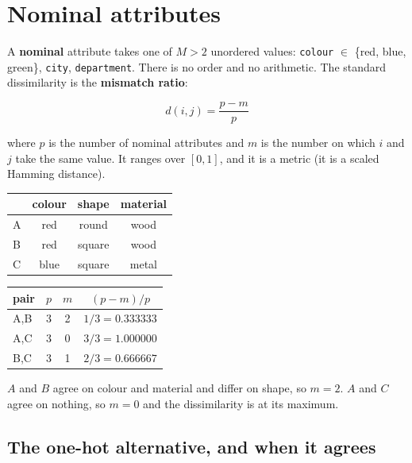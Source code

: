 \documentclass[11pt]{article}
\begin{document}
\section{Nominal attributes}
\label{sec:nominal}

A \textbf{nominal} attribute takes one of $M > 2$ unordered values:
\texttt{colour} $\in$ \{red, blue, green\}, \texttt{city},
\texttt{department}. There is no order and no arithmetic. The standard
dissimilarity is the \textbf{mismatch ratio}:

\begin{equation}
  d(i,j) = \frac{p - m}{p}
  \label{eq:nominal}
\end{equation}

where $p$ is the number of nominal attributes and $m$ is the number on which
$i$ and $j$ take the same value. It ranges over $[0,1]$, and it is a metric
(it is a scaled Hamming distance).

\begin{worked}
\begin{center}
\begin{tabular}{lccc}
  \toprule
  & colour & shape & material \\ \midrule
  A & red & round & wood \\
  B & red & square & wood \\
  C & blue & square & metal \\ \bottomrule
\end{tabular}
\qquad
\begin{tabular}{lccc}
  \toprule
  pair & $p$ & $m$ & $(p-m)/p$ \\ \midrule
  A,B & 3 & 2 & $1/3 = 0.333333$ \\
  A,C & 3 & 0 & $3/3 = 1.000000$ \\
  B,C & 3 & 1 & $2/3 = 0.666667$ \\ \bottomrule
\end{tabular}
\end{center}
$A$ and $B$ agree on colour and material and differ on shape, so $m = 2$.
$A$ and $C$ agree on nothing, so $m = 0$ and the dissimilarity is at its
maximum.
\end{worked}

\subsection{The one-hot alternative, and when it agrees}
\end{document}
